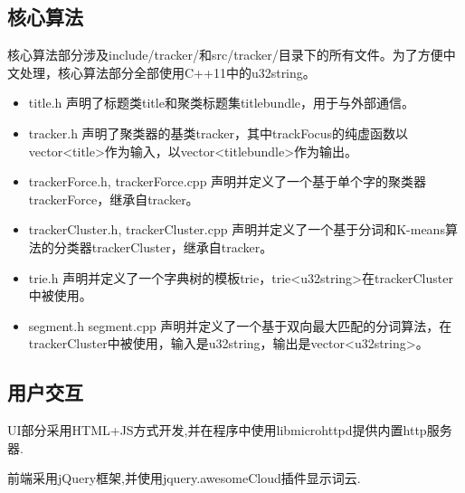\documentclass[12pt]{article}
\begin{document}
\subsection{核心算法}
核心算法部分涉及include/tracker/和src/tracker/目录下的所有文件。为了方便中文处理，核心算法部分全部使用C++11中的u32string。
\begin{itemize}
\item title.h 声明了标题类title和聚类标题集titlebundle，用于与外部通信。
\item tracker.h 声明了聚类器的基类tracker，其中trackFocus的纯虚函数以vector<title>作为输入，以vector<titlebundle>作为输出。
\item trackerForce.h, trackerForce.cpp 声明并定义了一个基于单个字的聚类器trackerForce，继承自tracker。
\item trackerCluster.h, trackerCluster.cpp 声明并定义了一个基于分词和K-means算法的分类器trackerCluster，继承自tracker。
\item trie.h 声明并定义了一个字典树的模板trie，trie<u32string>在trackerCluster中被使用。
\item segment.h segment.cpp 声明并定义了一个基于双向最大匹配的分词算法，在trackerCluster中被使用，输入是u32string，输出是vector<u32string>。

\end{itemize}

\subsection{用户交互}

UI部分采用HTML+JS方式开发,并在程序中使用libmicrohttpd提供内置http服务器.

前端采用jQuery框架,并使用jquery.awesomeCloud插件显示词云.

\end{document}
